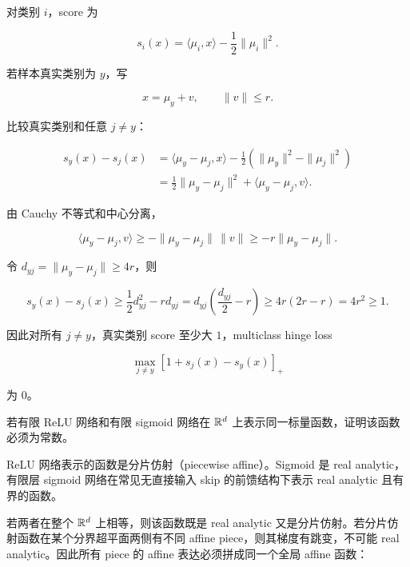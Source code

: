 \solution
对类别 \(i\)，score 为

\[
  s_i(x)=\langle \mu_i,x\rangle-\frac12\|\mu_i\|^2.
\]

若样本真实类别为 \(y\)，写

\[
  x=\mu_y+v,
  \qquad \|v\|\le r.
\]

比较真实类别和任意 \(j\ne y\)：

\[
\begin{aligned}
  s_y(x)-s_j(x)
  &=
  \langle \mu_y-\mu_j,x\rangle
  -\frac12(\|\mu_y\|^2-\|\mu_j\|^2)\\
  &=
  \frac12\|\mu_y-\mu_j\|^2
  +
  \langle \mu_y-\mu_j,v\rangle.
\end{aligned}
\]

由 Cauchy 不等式和中心分离，

\[
  \langle \mu_y-\mu_j,v\rangle
  \ge
  -\|\mu_y-\mu_j\|\,\|v\|
  \ge
  -r\|\mu_y-\mu_j\|.
\]

令 \(d_{yj}=\|\mu_y-\mu_j\|\ge4r\)，则

\[
  s_y(x)-s_j(x)
  \ge
  \frac12 d_{yj}^2-rd_{yj}
  =
  d_{yj}\left(\frac{d_{yj}}2-r\right)
  \ge
  4r(2r-r)=4r^2\ge 1.
\]

因此对所有 \(j\ne y\)，真实类别 score 至少大 \(1\)，multiclass hinge loss

\[
  \max_{j\ne y}[1+s_j(x)-s_y(x)]_+
\]

为 \(0\)。

\begin{examproblem}
若有限 ReLU 网络和有限 sigmoid 网络在 \(\mathbb{R}^d\) 上表示同一标量函数，证明该函数必须为常数。
\end{examproblem}

\solution
ReLU 网络表示的函数是分片仿射（piecewise affine）。Sigmoid 是 real analytic，有限层 sigmoid 网络在常见无直接输入 skip 的前馈结构下表示 real analytic 且有界的函数。

若两者在整个 \(\mathbb{R}^d\) 上相等，则该函数既是 real analytic 又是分片仿射。若分片仿射函数在某个分界超平面两侧有不同 affine piece，则其梯度有跳变，不可能 real analytic。因此所有 piece 的 affine 表达必须拼成同一个全局 affine 函数：

